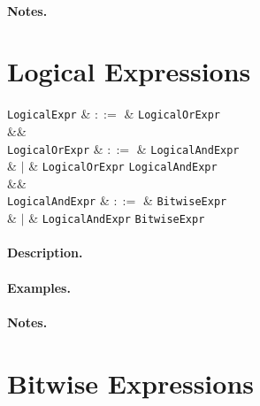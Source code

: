 \paragraph{Notes.} 


\section{Logical Expressions}

\begin{syntax}
  \verb+LogicalExpr+ & $::=$ & \verb+LogicalOrExpr+ \\
  &&\\
  \verb+LogicalOrExpr+ & $::=$ & \verb+LogicalAndExpr+ \\
                           & $|$ & \verb+LogicalOrExpr+ \token{||} \verb+LogicalAndExpr+\\
  &&\\
  \verb+LogicalAndExpr+ & $::=$ & \verb+BitwiseExpr+ \\
                            & $|$ & \verb+LogicalAndExpr+ \token{\&\&} \verb+BitwiseExpr+\\
\end{syntax}

\paragraph{Description.}

\paragraph{Examples.}

\paragraph{Notes.} 


\section{Bitwise Expressions}


